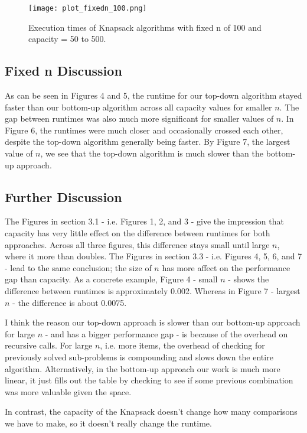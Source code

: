 \documentclass{article}
\begin{document}
\begin{figure}[h!]
    \centering
    \texttt{[image: plot\_fixedn\_100.png]}
    \caption{Execution times of Knapsack algorithms with fixed n of 100 and capacity = 50 to 500.}
\end{figure}

\subsection{Fixed n Discussion}
As can be seen in Figures 4 and 5, the runtime for our top-down algorithm stayed faster than our bottom-up algorithm across all capacity values for smaller $n$. The gap between runtimes was also much more significant for smaller values of $n$. In Figure 6, the runtimes were much closer and occasionally crossed each other, despite the top-down algorithm generally being faster. By Figure 7, the largest value of $n$, we see that the top-down algorithm is much slower than the bottom-up approach.

\subsection{Further Discussion}
The Figures in section 3.1 - i.e. Figures 1, 2, and 3 - give the impression that capacity has very little effect on the difference between runtimes for both approaches. Across all three figures, this difference stays small until large $n$, where it more than doubles. The Figures in section 3.3 - i.e. Figures 4, 5, 6, and 7 - lead to the same conclusion; the size of $n$ has more affect on the performance gap than capacity. As a concrete example, Figure 4 - small $n$ - shows the difference between runtimes is approximately 0.002. Whereas in Figure 7 - largest $n$  - the difference is about 0.0075.

I think the reason our top-down approach is slower than our bottom-up approach for large $n$ - and has a bigger performance gap - is because of the overhead on recursive calls. For large $n$, i.e. more items, the overhead of checking for previously solved sub-problems is compounding and slows down the entire algorithm. Alternatively, in the bottom-up approach our work is much more linear, it just fills out the table by checking to see if some previous combination was more valuable given the space. 

In contrast, the capacity of the Knapsack doesn't change how many comparisons we have to make, so it doesn't really change the runtime.
\end{document}
